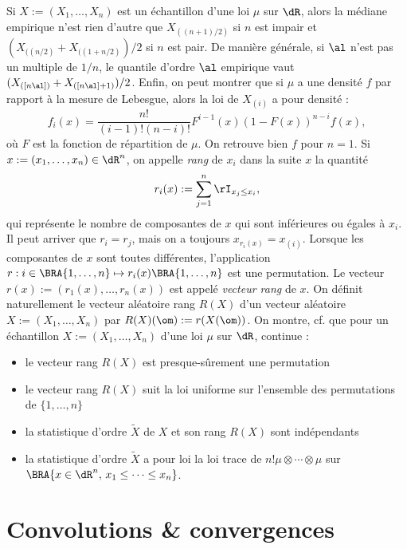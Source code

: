 Si $X:=(X_1,\ldots,X_n)$ est un échantillon d'une loi $\mu$ sur $\dR$, alors la
médiane empirique n'est rien d'autre que $X_{((n+1)/2)}$ si $n$ est impair et
$(X_{((n/2)}+X_{((1+n/2)})/2$ si $n$ est pair. De manière générale, si $\al$
n'est pas un multiple de $1/n$, le quantile d'ordre $\al$ empirique vaut
$(X_{([n\al])}+X_{([n\al]+1)})/2$. Enfin, on peut montrer que si $\mu$ a une
densité $f$ par rapport à la mesure de Lebesgue, alors la loi de $X_{(i)}$ a
pour densité :
$$
f_i(x)=\frac{n!}{(i-1)!(n-i)!}F^{i-1}(x)(1-F(x))^{n-i}f(x),
$$
où $F$ est la fonction de répartition de $\mu$. On retrouve bien $f$ pour
$n=1$. Si $x:=(x_1,\ldots,x_n)\in\dR^n$, on appelle \emph{rang} de $x_i$ dans la
suite $x$ la quantité
$$
r_i(x):=\sum_{j=1}^n \rI_{x_j\leq x_i},
$$
qui représente le nombre de composantes de $x$ qui sont inférieures ou
égales à $x_i$. Il peut arriver que $r_i=r_j$, mais on a toujours
$x_{r_i(x)}=x_{(i)}$. Lorsque les composantes de $x$ sont toutes différentes,
l'application $r:i\in\BRA{1,\ldots,n}\mapsto r_i(x)\BRA{1,\ldots,n}$ est une permutation.  Le
vecteur $r(x):=(r_1(x),\ldots,r_n(x))$ est appelé \emph{vecteur rang} de $x$. On
définit naturellement le vecteur aléatoire rang $R(X)$ d'un vecteur aléatoire
$X:=(X_1,\ldots,X_n)$ par $R(X)(\om):=r(X(\om))$. On montre, cf. \cite[thm 4.4.29
page 107]{dacunha-castelle-duflo} que pour un échantillon $X:=(X_1,\ldots,X_n)$ d'une loi
$\mu$ sur $\dR$, continue :
\begin{itemize}
\item le vecteur rang $R(X)$ est presque-sûrement une permutation
\item le vecteur rang $R(X)$ suit la loi uniforme sur l'ensemble des
  permutations de $\{1,\ldots,n\}$
\item la statistique d'ordre $\tilde{X}$ de $X$ et son rang $R(X)$ sont
  indépendants 
\item la statistique d'ordre $\tilde{X}$ a pour loi la loi trace de $n!
  \mu\otimes\cdots\otimes\mu$ sur $\BRA{x\in\dR^n,\,x_1\leq\cdots\leq x_n}$.
\end{itemize}

%
\section{Convolutions \& convergences}
%

